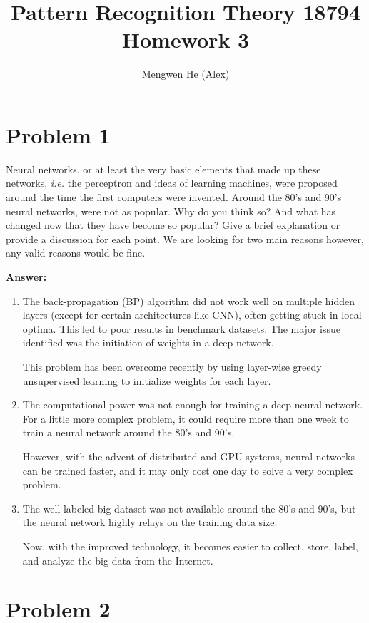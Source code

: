 \documentclass[letterpaper,11pt]{article}
\title{\textbf{Pattern Recognition Theory 18794 Homework 3}}
\author{Mengwen He (Alex)}
\begin{document}
	
\maketitle
	
\section*{Problem 1}	
	
Neural networks, or at least the very basic elements that made up these networks, \textit{i.e.} the perceptron and ideas of learning machines, were proposed around the time the first computers were invented. Around the 80's and 90's neural networks, were not as popular. Why do you think so? And what has changed now that they have become so popular? Give a brief explanation or provide a discussion for each point. We are looking for two main reasons however, any valid reasons would be fine.

\textbf{Answer:}\\
\begin{enumerate}
	\item The back-propagation (BP) algorithm did not work well on multiple hidden layers (except for certain architectures like CNN), often getting stuck in local optima. This led to poor results in benchmark datasets. The major issue identified was the initiation of weights in a deep network.
	
	This problem has been overcome recently by using layer-wise greedy unsupervised learning to initialize weights for each layer.
	
	\item The computational power was not enough for training a deep neural network. For a little more complex problem, it could require more than one week to train a neural network around the 80's and 90's.
	
	However, with the advent of distributed and GPU systems, neural networks can be trained faster, and it may only cost one day to solve a very complex problem.
	
	\item The well-labeled big dataset was not available around the 80's and 90's, but the neural network highly relays on the training data size.
	
	Now, with the improved technology, it becomes easier to collect, store, label, and analyze the big data from the Internet.
\end{enumerate}

\section*{Problem 2}
\end{document}
